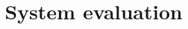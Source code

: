 \documentclass[
	paper=A4,
	titlepage=true,
	appendixprefix=true,
	headings=appendixwithoutprefixline,
	fontsize=11pt,
	parskip=half
]{scrreprt}
\begin{document}



	\chapter{System evaluation} {
	\label{ch:system_evaluation}
		
	}


	

	
\end{document}
